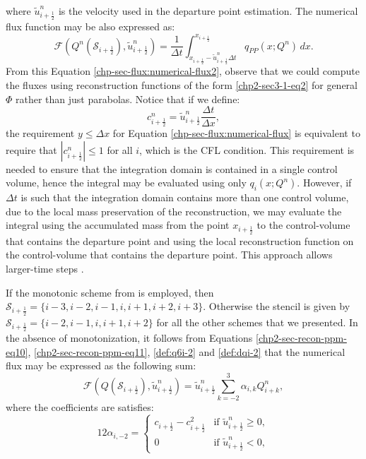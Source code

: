 where $\tilde{u}_{i+\frac{1}{2}}^n$ is the velocity used in the departure point estimation.
The numerical flux function may be also expressed as:
\begin{equation}
	\label{chp-sec-flux:numerical-flux2}
	\mathcal{F}(Q^n(\mathcal{S}_{i+\frac{1}{2}}),\tilde{u}_{i+\frac{1}{2}}^n) =  \frac{1}{\Delta t} 
	\int_{x_{i+\frac{1}{2}}-\tilde{u}^n_{i+\frac{1}{2}}\Delta t}^{x_{i+\frac{1}{2}}}
	q_{PP}(x;Q^n) \,dx.
\end{equation}
From this Equation \eqref{chp-sec-flux:numerical-flux2}, observe that we could compute the fluxes using reconstruction functions of the form \eqref{chp2-sec3-1-eq2}
for general $\Phi$ rather than just parabolas.
Notice that if we define:
\begin{equation*}
	\label{chp-sec-flux:cedges}
	c_{i+\frac{1}{2}}^n = \tilde{u}_{i+\frac{1}{2}}^n\frac{\Delta t}{\Delta x},
\end{equation*}
the requirement $y\leq \Delta x$ for 
Equation \eqref{chp-sec-flux:numerical-flux} is equivalent
to require that $|c^{n}_{i+\frac{1}{2}}| \leq 1$ for all $i$,  which is the CFL condition.
This requirement is needed to ensure that the integration domain is contained in a single control volume, hence
the integral may be evaluated using only $q_i(x;Q^n)$. However, if $\Delta t$ is such that the integration domain
contains more than one control volume, due to the local mass preservation of the reconstruction, we may evaluate the integral
using the accumulated mass from the point $x_{i+\frac{1}{2}}$ to the control-volume that contains the departure point and using
the local reconstruction function on the control-volume that contains the departure point.
This approach allows larger-time steps \citep{chen:2017}.

If the monotonic scheme from \citet{lin:2004} is employed, then $\mathcal{S}_{i+\frac{1}{2}} = \{i-3,i-2,i-1,i,i+1,i+2,i+3\}$.
Otherwise the stencil is given by $\mathcal{S}_{i+\frac{1}{2}} = \{i-2,i-1,i,i+1,i+2\}$ for all the other schemes that we presented.
In the absence of monotonization, it follows from Equations
\eqref{chp2-sec-recon-ppm-eq10}, \eqref{chp2-sec-recon-ppm-eq11},
\eqref{def:q6i-2} and \eqref{def:dqi-2}
that the numerical flux may be expressed as the following sum:
\begin{equation*}
	\label{chp-sec-flux:numerical-flux-stencil}
	\mathcal{F}(Q(\mathcal{S}_{i+\frac{1}{2}}),\tilde{u}_{i+\frac{1}{2}}^n) = \tilde{u}_{i+\frac{1}{2}}^n
	\sum_{k=-2}^{3} \alpha_{i,k}Q_{i+k}^n,
\end{equation*}
where the coefficients are satisfies:
\begin{equation*}
	12\alpha_{i,-2} =  
    	\begin{cases}
		c_{i+\frac{1}{2}}-c_{i+\frac{1}{2}}^2 &
		\text{if } \tilde{u}_{i+\frac{1}{2}}^n \geq 0,\\
		0 & \text{if } \tilde{u}_{i+\frac{1}{2}}^n<0,
    	\end{cases}
\end{equation*}

